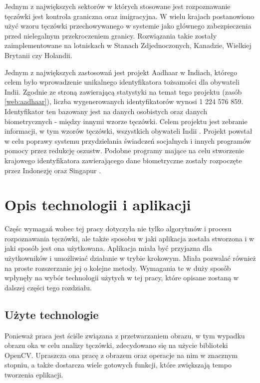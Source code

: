 \documentclass[10pt,polish,a4paper,oneside]{ppfcmthesis}
\begin{document}
Jednym z największych sektorów w których stosowane jest rozpoznawanie tęczówki jest kontrola graniczna
oraz imigracyjna. W wielu krajach postanowiono uży\'c wzoru tęczówki przechowywanego w systemie jako głównego
zabezpieczenia przed nielegalnym przekroczeniem granicy. Rozwiązania takie zostały zaimplementowane na lotniskach
w Stanach Zdjednoczonych, Kanadzie, Wielkiej Brytanii czy Holandii.

Jednym z największych zastosowań jest projekt Aadhaar w Indiach, którego celem było wprowadzenie
unikalnego identyfikatora tożsamości dla obywateli Indii. Zgodnie ze stroną zawierającą statystyki na
temat tego projektu (zasób \ref{web:aadhaar}), liczba wygenerowanych identyfikatorów wynosi 1 224 576 859.
Identyfikator ten bazowany jest na danych
osobistych oraz danych biometrycznych - między innymi wzorze tęczówki. Celem projektu jest zebranie
informacji, w tym wzorów tęczówki, wszystkich obywateli Indii \cite{DaugmanIndia}. Projekt powstał w
celu poprawy systemu przydzielania świadczeń socjalnych i innych programów pomocy przez redukcję oszustw.
Podobne programy mające na celu stworzenie krajowego identyfikatora zawierającego dane biometryczne
zostały rozpoczęte przez Indonezję oraz Singapur \cite{DaugmanApplications}.

 \chapter{Opis technologii i aplikacji}

Częśc wymagań wobec tej pracy dotyczyła nie tylko algorytmów i procesu rozpoznawania
tęczówki, ale także sposobu w jaki aplikacja została stworzona i w jaki sposób jest
ona użytkowana. Aplikacja miała by\'c przyjazna dla użytkowników i umożliwia\'c działanie
w trybie krokowym. Miała pozwala\'c również na proste rozszerzanie jej o kolejne
metody. Wymagania te w duży sposób wpłynęły na wybór technologii użytych w tej pracy,
które opisane zostaną w dalszej części tego rozdziału.

\section{Użyte technologie}

Ponieważ praca jest ściśle związana z przetwarzaniem obrazu, w tym wypadku obrazu oka
w celu analizy tęczówki, zdecydowano się na użycie biblioteki OpenCV. Upraszcza ona pracę
z obrazem oraz operacje na nim w znacznym stopniu, a także dostarcza wiele gotowych
funkcji, które zwiększają tempo tworzenia eplikacji.\newline
\end{document}
